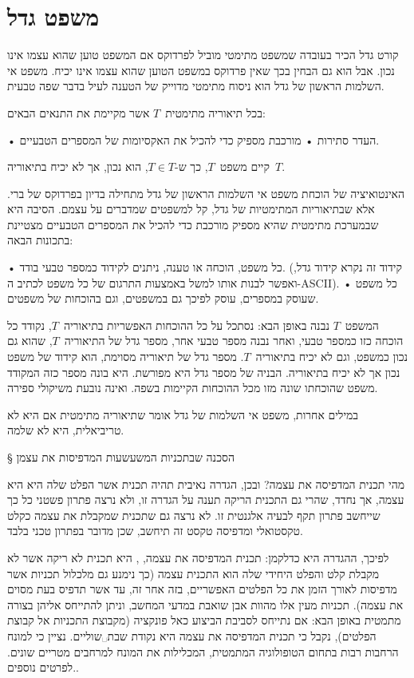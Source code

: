 \section{משפט גדל}
קורט גדל הכיר בעובדה שמשפט מתימטי מוביל לפרדוקס אם המשפט טוען שהוא עצמו אינו
נכון. אבל הוא גם הבחין בכך שאין פרדוקס במשפט הטוען שהוא עצמו אינו יכיח. משפט אי
השלמות הראשון של גדל הוא ניסוח מתימטי מדוייק של הטענה לעיל בדבר שפה טבעית.

\begin{mybox}
בכל תיאוריה מתימטית~$T$ אשר מקיימת את התנאים הבאים:
\begin{itemize}
• העדר סתירות
• מורכבת מספיק כדי להכיל את האקסיומות של המספרים הטבעיים.
\end{itemize}
קיים משפט~$T$, כך ש-$ T∈T$, הוא נכון, אך לא יכיח בתיאוריה~$T$.
\end{mybox}
האינטואיציה של הוכחת משפט אי השלמות הראשון של גדל מתחילה בדיון בפרדוקס של ברי.
אלא שבתיאוריות המתימטיות של גדל, קל למשפטים שמדברים על עצמם. הסיבה היא שבמערכת
מתימטית שהיא מספיק מורכבת כדי להכיל את המספרים הטבעיים מצטיינת בתכונות הבאה:

\begin{itemize}
• כל משפט, הוכחה או טענה, ניתנים לקידוד כמספר טבעי בודד. (קידוד זה נקרא קידוד
  גדל, ואפשר לבנות אותו למשל באמצעות התרגום של כל משפט לכתיב ה-ASCII).
• כל משפט שעוסק במספרים, עוסק לפיכך גם במשפטים, וגם בהוכחות של משפטים.
\end{itemize}
 המשפט~$T$ נבנה באופן הבא: נסתכל על כל ההוכחות האפשריות בתיאוריה~$T$, נקודד
 כל הוכחה כזו כמספר טבעי, ואחר נבנה מספר טבעי אחר, מספר גדל של התיאוריה~$T$,
 שהוא גם נכון כמשפט, וגם לא יכיח בתיאוריה~$T$. מספר גדל של תיאוריה מסוימת,
 הוא קידוד של משפט נכון אך לא יכיח בתיאוריה. הבניה של מספר גדל היא מפורשת. היא
 בונה מספר כזה המקודד משפט שהוכחתו שונה מזו מכל ההוכחות הקיימות בשפה. ואינה
 נובעת משיקולי ספירה.

 במילים אחרות, משפט אי השלמות של גדל אומר שתיאוריה מתימטית אם היא לא טריביאלית,
 היא לא שלמה.

§ הסכנה שבתכניות המשעשעות המדפיסות את עצמן

מהי תכנית המדפיסה את עצמה? ובכן, הגדרה נאיבית תהיה תכנית אשר הפלט שלה היא היא
עצמה, אך נחדד, שהרי גם התכנית הריקה תענה על הגדרה זו, ולא נרצה פתרון פשטני כל
כך שייחשב פתרון תקף לבעיה אלגנטית זו. לא נרצה גם שתכנית שמקבלת את עצמה כקלט
טקסטואלי ומדפיסה טקסט זה תיחשב, שכן מדובר בפתרון טכני בלבד.

לפיכך, ההגדרה היא כדלקמן: תכנית המדפיסה את עצמה, , היא תכנית לא ריקה
אשר לא מקבלת קלט והפלט היחידי שלה הוא התכנית עצמה (כך נימנע גם מלכלול תכניות
אשר מדפיסות לאורך הזמן את כל הפלטים האפשריים, בזה אחר זה, עד אשר תדפיס בעת
מסוים את עצמה). תכניות מעין אלו מהוות אבן שואבת במדעי המחשב, וניתן להתייחס
אליהן בצורה מתמטית באופן הבא: אם נתייחס לסביבת הביצוע כאל פונקציה (מקבוצת
התכניות אל קבוצת הפלטים), נקבל כי תכנית המדפיסה את עצמה היא נקודת
שבת␣שוליים{. נציין כי למונח הרחבות רבות בתחום הטופולוגיה
המתמטית, המכלילות את המונח למרחבים מטריים שונים. לפרטים נוספים.}.

